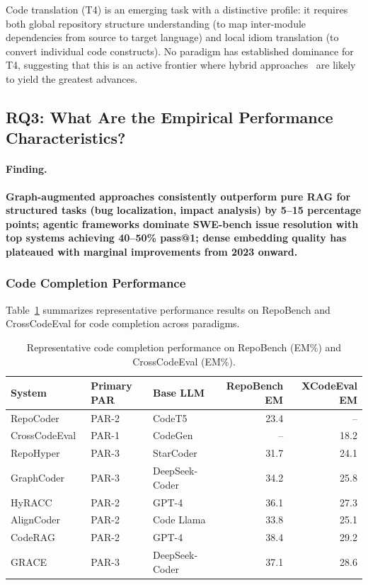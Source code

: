 Code translation (T4) is an emerging task with a distinctive profile: it requires both global
repository structure understanding (to map inter-module dependencies from source to target
language) and local idiom translation (to convert individual code constructs). No paradigm
has established dominance for T4, suggesting that this is an active frontier where hybrid
approaches~\cite{ibrahimzada2025alphatrans, feng2026dependency} are likely to yield the
greatest advances.

\subsection{RQ3: What Are the Empirical Performance Characteristics?}
\label{subsec:rq3}

\paragraph{Finding.}
\textbf{Graph-augmented approaches consistently outperform pure RAG for structured tasks (bug
localization, impact analysis) by 5--15 percentage points; agentic frameworks dominate SWE-bench
issue resolution with top systems achieving 40--50\% pass@1; dense embedding quality has
plateaued with marginal improvements from 2023 onward.}

\subsubsection{Code Completion Performance}

Table~\ref{tab:completion-perf} summarizes representative performance results on RepoBench
and CrossCodeEval for code completion across paradigms.

\begin{table}[ht]
\caption{Representative code completion performance on RepoBench (EM\%) and CrossCodeEval (EM\%).}
\label{tab:completion-perf}
\small
\begin{tabular}{lllrr}
\toprule
\textbf{System} & \textbf{Primary PAR} & \textbf{Base LLM} & \textbf{RepoBench EM} & \textbf{XCodeEval EM} \\
\midrule
RepoCoder~\cite{zhang2023repocoder}           & PAR-2 & CodeT5        & 23.4 & -- \\
CrossCodeEval~\cite{ding2023crosscodeeval}    & PAR-1 & CodeGen       & -- & 18.2 \\
RepoHyper~\cite{phan2025repohyper}            & PAR-3 & StarCoder     & 31.7 & 24.1 \\
GraphCoder~\cite{liu2024graphcoder}           & PAR-3 & DeepSeek-Coder & 34.2 & 25.8 \\
HyRACC~\cite{li2025hyracc}                   & PAR-2 & GPT-4         & 36.1 & 27.3 \\
AlignCoder~\cite{jiang2025aligncoder}         & PAR-2 & Code Llama    & 33.8 & 25.1 \\
CodeRAG~\cite{zhang2025coderag}               & PAR-2 & GPT-4         & 38.4 & 29.2 \\
GRACE~\cite{wang2025grace}                    & PAR-3 & DeepSeek-Coder & 37.1 & 28.6 \\
\bottomrule
\end{tabular}
\end{table}


